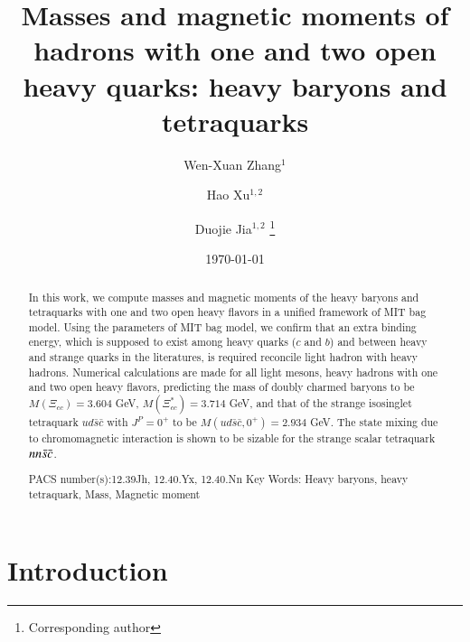 \documentclass[prd,twocolumn,floatfix,nofootinbib]{revtex4}
\begin{document}
\title{Masses and magnetic moments of hadrons with one and two open heavy
quarks: heavy baryons and tetraquarks}
\author{Wen-Xuan Zhang$^{1}$}
\author{Hao Xu$^{1,2}$}
\author{Duojie Jia$^{1,2}$ \thanks{%
Corresponding author}}

\begin{abstract}
In this work, we compute masses and magnetic moments of the heavy baryons
and tetraquarks with one and two open heavy flavors in a unified framework
of MIT bag model. Using the parameters of MIT bag model, we confirm that an
extra binding energy, which is supposed to exist among heavy quarks ($c$ and
$b$) and between heavy and strange quarks in the literatures, is required
reconcile light hadron with heavy hadrons. Numerical calculations are made
for all light mesons, heavy hadrons with one and two open heavy flavors,
predicting the mass of doubly charmed baryons to be $M(\Xi _{cc})=3.604$
GeV, $M(\Xi _{cc}^{\ast })=3.714$ GeV, and that of the strange isosinglet
tetraquark $ud\bar{s}\bar{c}$ with $J^{P}=0^{+}$ to be $M\left( ud\bar{s}%
\bar{c},0^{+}\right) =2.934$ GeV. The state mixing due to chromomagnetic
interaction is shown to be sizable for the strange scalar tetraquark $nn\bar{%
s}\bar{c}$.

{\normalsize PACS number(s):12.39Jh, 12.40.Yx, 12.40.Nn} {\normalsize Key
Words: Heavy baryons, heavy tetraquark, Mass, Magnetic moment}
\end{abstract}

\maketitle
\date{\today }


\section{Introduction}
\end{document}
